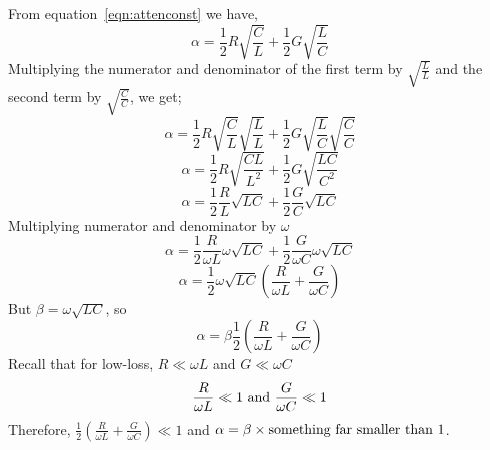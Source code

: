 From equation~\ref{eqn:attenconst} we have,
\begin{equation*}
\alpha =\frac{1}{2}R\sqrt{\frac{C}{L}} + \frac{1}{2}G\sqrt{\frac{L}{C}}	
\end{equation*}
Multiplying the numerator and denominator of the first term by $\sqrt{\frac{L}{L}}$ and the second term by $\sqrt{\frac{C}{C}}$, we get;
\begin{equation*}
\alpha = \frac{1}{2} R \sqrt{\frac{C}{L}} \sqrt{\frac{L}{L}} + \frac{1}{2} G \sqrt{\frac{L}{C}} \sqrt{\frac{C}{C}} 
\end{equation*}
\begin{equation*}
\alpha =  \frac{1}{2} R \sqrt{\frac{CL}{L^2}} + \frac{1}{2} G \sqrt{\frac{LC}{C^2}}	
\end{equation*}
\begin{equation*}
\alpha = \frac{1}{2} \frac{R}{L} \sqrt{LC} + \frac{1}{2} \frac{G}{C} \sqrt{LC}
\end{equation*}
Multiplying numerator and denominator by $\omega$
\begin{equation*}
\alpha = \frac{1}{2} \frac{R}{\omega L} \omega \sqrt{LC} + \frac{1}{2} \frac{G}{\omega C} \omega \sqrt{LC}
\end{equation*}
\begin{equation*}
\alpha = \frac{1}{2} \omega\sqrt{LC}\left(\frac{R}{\omega L} + \frac{G}{\omega C}\right)
\end{equation*}
But $\beta = \omega \sqrt{LC}$, so
\begin{equation}
\alpha = \beta\frac{1}{2} \left(\frac{R}{\omega L} + \frac{G}{\omega C}\right)
\end{equation}
Recall that for low-loss, $R \ll \omega L$ and $G \ll \omega C$
\[\frac{R}{\omega L} \ll 1\textnormal{ and }\frac{G}{\omega C} \ll 1\]
Therefore,  $\frac{1}{2} \left(\frac{R}{\omega L} + \frac{G}{\omega C}\right) \ll 1$ and $\alpha = \beta \times \textnormal{something far smaller than 1}$.

